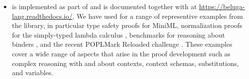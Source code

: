\begin{itemize}
\item
  \Harpoon{} is implemented as part of \Beluga{} and is documented together with
  \Beluga{} at \url{https://beluga-lang.readthedocs.io/}.
  We have used \Harpoon{} for a range of representive examples from the
  \Beluga{} library, in particular type safety proofs for
  MiniML, normalization proofs for the simply-typed lambda calculus
  \cite{Cave:MSCS18},
  benchmarks for reasoning about binders
  \cite{Felty:MSCS17,Felty:orbi-survey},
  and the recent POPLMark Reloaded challenge \cite{POPLMarkReloaded:19}.
  These examples cover a wide range of aspects that arise in the
  proof development such as complex reasoning with and about contexts,
  context schemas, substitutions, and variables.
\end{itemize}


